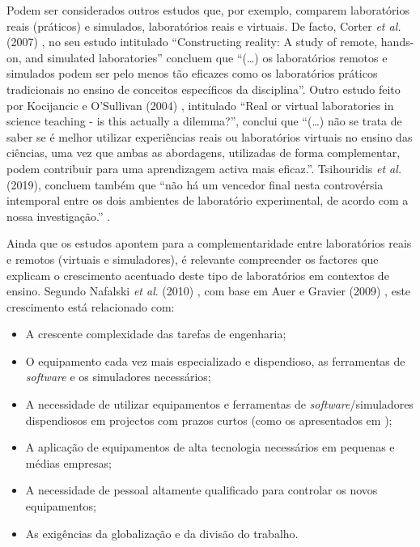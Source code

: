 Podem ser considerados outros estudos que, por exemplo, comparem laboratórios reais (práticos) e simulados, laboratórios reais e virtuais. De facto, Corter \textit{et al.} (2007) \cite{StudyRemoteHandsonSimulatedLabs}, no seu estudo intitulado ``Constructing reality: A study of remote, hands-on, and simulated laboratories'' concluem que ``(\ldots) os laboratórios remotos e simulados podem ser pelo menos tão eficazes como os laboratórios práticos tradicionais no ensino de conceitos específicos da disciplina''. Outro estudo feito por Kocijancic e O'Sullivan (2004) \cite{RealorVirtualDilema}, intitulado ``Real or virtual laboratories in science teaching - is this actually a dilemma?'', conclui que ``(\ldots) não se trata de saber se é melhor utilizar experiências reais ou laboratórios virtuais no ensino das ciências, uma vez que ambas as abordagens, utilizadas de forma complementar, podem contribuir para uma aprendizagem activa mais eficaz.''. Tsihouridis \textit{et al.} (2019), concluem também que ``não há um vencedor final nesta controvérsia intemporal entre os dois ambientes de laboratório experimental, de acordo com a nossa investigação.'' \cite{controversy}.

Ainda que os estudos apontem para a complementaridade entre laboratórios reais e remotos (virtuais e simuladores), é relevante compreender os factores que explicam o crescimento acentuado deste tipo de laboratórios em contextos de ensino. Segundo Nafalski \textit{et al}. (2010) \cite{ExperiencesRemoteLaboratories}, com base em Auer e Gravier (2009) \cite{ThemMnyfacesRemotLab}, este crescimento está relacionado com:

\begin{itemize}
    \item A crescente complexidade das tarefas de engenharia;
    \item O equipamento cada vez mais especializado e dispendioso, as ferramentas de \textit{software} e os simuladores necessários;
    \item A necessidade de utilizar equipamentos e ferramentas de \textit{software}/simuladores dispendiosos em projectos com prazos curtos (como os apresentados em \cite{ExperiencesRemoteLab});
    \item A aplicação de equipamentos de alta tecnologia necessários em pequenas e médias empresas;
    \item A necessidade de pessoal altamente qualificado para controlar os novos equipamentos;
    \item As exigências da globalização e da divisão do trabalho.
\end{itemize}

